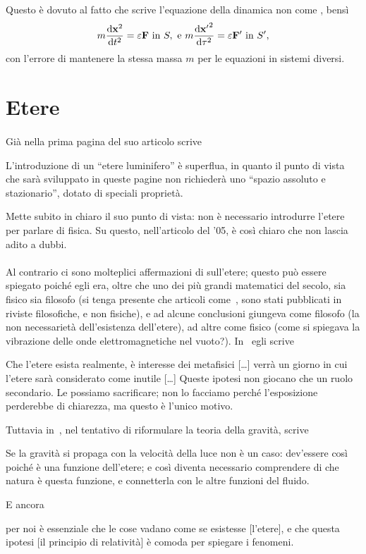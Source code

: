 Questo \`e dovuto al fatto che scrive l'equazione della
dinamica non come \poin, bens\`i
\begin{displaymath}
 m \frac{\mathrm{d} \mathbf{x}^2}{\mathrm{d} t^2} = \varepsilon \mathbf{F} \mbox{ in } S,
 \mbox{ e } m \frac{\mathrm{d} \mathbf{x'}^2}{\mathrm{d} \tau^2} = \varepsilon \mathbf{F'}
 \mbox{ in } S', 
\end{displaymath} 
con l'errore di mantenere la stessa massa $m$ per le equazioni in sistemi
diversi. 
\section{Etere}
\paragraph{\ein} Gi\`a nella prima pagina del suo articolo scrive
\begin{citaz}
  L'introduzione di un ``etere luminifero'' \`e superflua, in quanto
  il punto di vista che sar\`a sviluppato in queste pagine non
  richieder\`a uno ``spazio assoluto e stazionario'', dotato di
  speciali propriet\`a.
\end{citaz}
Mette subito in chiaro il suo punto di vista: non \`e necessario
introdurre l'etere per parlare di fisica. Su questo, nell'articolo del
'05, \`e cos\`i chiaro che non lascia adito a dubbi.

\paragraph{\poin} Al contrario ci sono molteplici affermazioni di
\poin{} sull'etere; questo pu\`o essere spiegato poich\'e egli era, oltre
che uno dei pi\`u grandi matematici del secolo, sia
fisico sia filosofo (si tenga presente che articoli
come~\cite{carro5}, sono stati pubblicati in riviste filosofiche, e
non fisiche), e ad
alcune conclusioni giungeva come filosofo (la non necessariet\`a
dell'esistenza dell'etere), ad altre come fisico (come si spiegava la
vibrazione delle onde elettromagnetiche nel vuoto?). In~\cite{carro4}
egli scrive
\begin{citaz}
 Che l'etere esista realmente, \`e interesse dei
 metafisici [\ldots] verr\`a un giorno in cui l'etere sar\`a considerato
 come inutile [\ldots] Queste ipotesi non giocano che un ruolo
 secondario. Le possiamo sacrificare; non lo facciamo perch\'e
 l'esposizione perderebbe di chiarezza, ma questo \`e l'unico motivo.
\end{citaz}

Tuttavia in~\cite{carro1}, nel tentativo di riformulare la teoria
della gravit\`a, scrive
\begin{citaz}
  Se la gravit\`a si propaga con la velocit\`a della luce non \`e un
  caso: dev'essere cos\`i poich\'e \`e una funzione dell'etere; e
  cos\`i diventa necessario comprendere di che natura \`e questa
  funzione, e connetterla con le altre funzioni del fluido.
\end{citaz}
E ancora
\begin{citaz}
  [\ldots] per noi \`e essenziale che le cose vadano come se esistesse
  [l'etere], e che questa ipotesi [il principio di relativit\`a] \`e
  comoda per spiegare i fenomeni.
\end{citaz}

